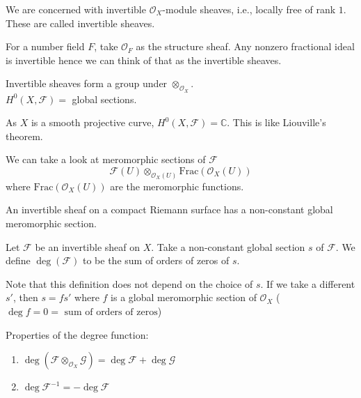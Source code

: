 \documentclass[oneside, 12pt]{scrbook}
\newcommand{\CC}{\mathbb C}
\theoremstyle{theorem}
\begin{document}
We are concerned with invertible $\mathcal{O}_{X}$-module sheaves, i.e., locally free of rank $1$. These are called invertible sheaves. 

\begin{example}
For a number field $F$, take $\mathcal{O}_{F}$ as the structure sheaf. Any nonzero fractional ideal is invertible hence we can think of that as the invertible sheaves.
\end{example}

Invertible sheaves form a group under $\otimes_{\mathcal{O}_{X}}$. \\

$H^{0}(X, \mathcal{F})=$ global sections. 

\begin{remark}
As $X$ is a smooth projective curve, $H^{0}(X, \mathcal{F})=\CC$. This is like Liouville's theorem.
\end{remark}

We can take a look at meromorphic sections of $\mathcal{F}$ $$\mathcal{F}(U) \otimes_{\mathcal{O}_{X}(U)} \mathrm{Frac}(\mathcal{O}_{X}(U))$$ where $\mathrm{Frac}(\mathcal{O}_{X}(U))$ are the meromorphic functions. 

\begin{theorem}
An invertible sheaf on a compact Riemann surface has a non-constant global meromorphic section.
\end{theorem}

\begin{definition}
Let $\mathcal{F}$ be an invertible sheaf on $X$. Take a non-constant global section $s$ of $\mathcal{F}$. We define $\deg(\mathcal{F})$ to be the sum of orders of zeros of $s$. 
\end{definition}

\begin{remark}
Note that this definition does not depend on the choice of $s$. If we take a different $s'$, then $s = fs'$ where $f$ is a global meromorphic section of $\mathcal{O}_{X}$ ($\deg f = 0 = \text{ sum of orders of zeros}$)
\end{remark}

\begin{proposition}
Properties of the degree function:
\begin{enumerate}
\item $\deg(\mathcal{F} \otimes_{\mathcal{O}_{X}} \mathcal{G}) = \deg \mathcal{F} + \deg \mathcal{G}$
\item $\deg \mathcal{F}^{-1} = - \deg \mathcal{F}$
\end{enumerate}
\end{proposition}
\end{document}
